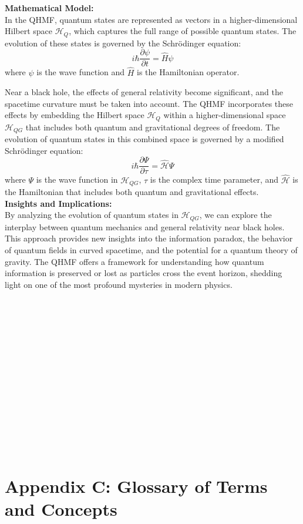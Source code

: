 \documentclass{article}
\begin{document}
\textbf{Mathematical Model:}
\\

In the QHMF, quantum states are represented as vectors in a higher-dimensional Hilbert space \( \mathcal{H}_Q \), which captures the full range of possible quantum states. The evolution of these states is governed by the Schrödinger equation:
\[
i\hbar \frac{\partial \psi}{\partial t} = \hat{H} \psi
\]
where \( \psi \) is the wave function and \( \hat{H} \) is the Hamiltonian operator.

Near a black hole, the effects of general relativity become significant, and the spacetime curvature must be taken into account. The QHMF incorporates these effects by embedding the Hilbert space \( \mathcal{H}_Q \) within a higher-dimensional space \( \mathcal{H}_{QG} \) that includes both quantum and gravitational degrees of freedom. The evolution of quantum states in this combined space is governed by a modified Schrödinger equation:
\[
i\hbar \frac{\partial \Psi}{\partial \tau} = \hat{\mathcal{H}} \Psi
\]
where \( \Psi \) is the wave function in \( \mathcal{H}_{QG} \), \( \tau \) is the complex time parameter, and \( \hat{\mathcal{H}} \) is the Hamiltonian that includes both quantum and gravitational effects.
\\

\textbf{Insights and Implications:}
\\

By analyzing the evolution of quantum states in \( \mathcal{H}_{QG} \), we can explore the interplay between quantum mechanics and general relativity near black holes. This approach provides new insights into the information paradox, the behavior of quantum fields in curved spacetime, and the potential for a quantum theory of gravity. The QHMF offers a framework for understanding how quantum information is preserved or lost as particles cross the event horizon, shedding light on one of the most profound mysteries in modern physics.
\\
\\


\

\

\

\

\

\

\

\


\section*{Appendix C: Glossary of Terms and Concepts}
\
\end{document}

